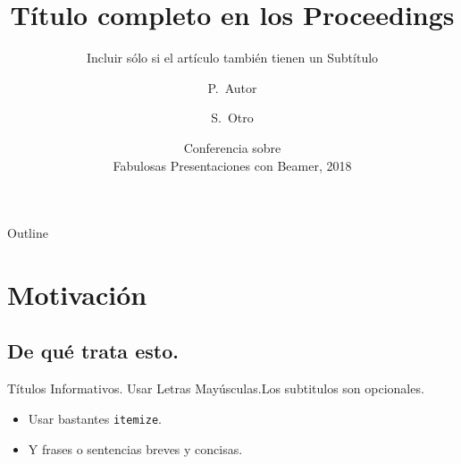 \documentclass{beamer}
\title[Título corto del trabajo] %
{Título completo en los Proceedings}
\subtitle
{Incluir sólo si el artículo también tienen un Subtítulo}
\author[Autor Principal, Otro Autor] %
{P.~Autor\inst{1} \and S.~Otro\inst{2}}
\institute[Universidades de Aquí y de  Allá] %
{
  \inst{1}%
  Departmento de Matemáticas\\
  Universidad de Aquí
  \and
  \inst{2}%
  Departmento de  Filosofía\\
  Universidad de Allá}
\date[Curso de {\LaTeX} 2018] %
{Conferencia sobre \\ Fabulosas Presentaciones  con Beamer, 2018}
\begin{document}
\begin{frame}
  \titlepage
\end{frame}

\begin{frame}{Outline}
  \tableofcontents
\end{frame}





\section{Motivación}

\subsection{De qué trata esto.}

\begin{frame}{Títulos Informativos. Usar Letras Mayúsculas.}{Los subtitulos son opcionales.}

  \begin{itemize}
  \item
    Usar bastantes  \texttt{itemize}.
  \item
    Y frases o sentencias breves y concisas.
  \end{itemize}
\end{frame}
\end{document}
